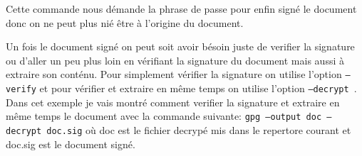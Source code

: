  Cette commande nous démande la phrase de passe pour enfin signé le document donc on ne peut plus nié être à l'origine du 
 document.
 
 Un fois le document signé on peut soit avoir  bésoin juste de verifier la signature  ou d'aller un peu plus loin en vérifiant
 la signature du document mais aussi à extraire son conténu.
 Pour simplement vérifier la signature on utilise l'option \texttt{--verify} et pour vérifier et extraire en même temps on utilise l'option
  \texttt{--decrypt }.
 Dans cet exemple je vais montré comment verifier la signature et extraire en même temps le document avec la commande suivante:
  \texttt{gpg --output doc --decrypt doc.sig}  où doc est le fichier decrypé mis dans le repertore courant et doc.sig est le document signé.
 

 






